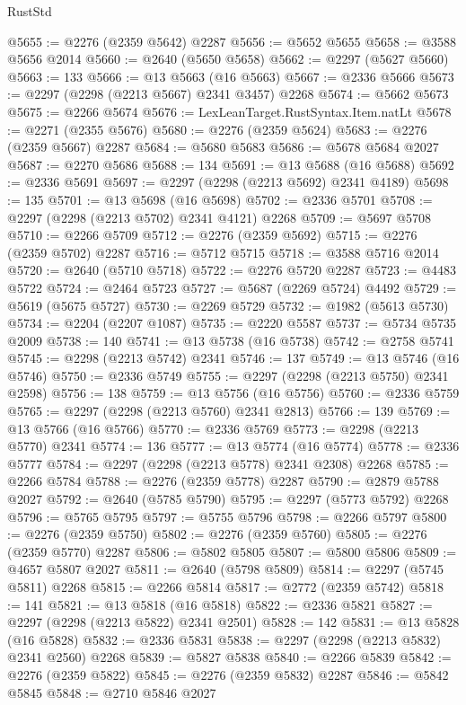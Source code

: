 \begin{lexlean}{RustStd}
\begin{coremodule}
{\begin{coremodule}
{{{{{{{{{{{{{{{{{{{{{{{{{{{{{{{{{{{{{{{{{{{{{{{{{{{{{{@5655 := @2276 (@2359 @5642) @2287
@5656 := @5652 @5655
@5658 := @3588 @5656 @2014
@5660 := @2640 (@5650 @5658)
@5662 := @2297 (@5627 @5660)
@5663 := 133
@5666 := @13 @5663 (@16 @5663)
@5667 := @2336 @5666
@5673 := @2297 (@2298 (@2213 @5667) @2341 @3457) @2268
@5674 := @5662 @5673
@5675 := @2266 @5674
@5676 := LexLeanTarget.RustSyntax.Item.natLt
@5678 := @2271 (@2355 @5676)
@5680 := @2276 (@2359 @5624)
@5683 := @2276 (@2359 @5667) @2287
@5684 := @5680 @5683
@5686 := @5678 @5684 @2027
@5687 := @2270 @5686
@5688 := 134
@5691 := @13 @5688 (@16 @5688)
@5692 := @2336 @5691
@5697 := @2297 (@2298 (@2213 @5692) @2341 @4189)
@5698 := 135
@5701 := @13 @5698 (@16 @5698)
@5702 := @2336 @5701
@5708 := @2297 (@2298 (@2213 @5702) @2341 @4121) @2268
@5709 := @5697 @5708
@5710 := @2266 @5709
@5712 := @2276 (@2359 @5692)
@5715 := @2276 (@2359 @5702) @2287
@5716 := @5712 @5715
@5718 := @3588 @5716 @2014
@5720 := @2640 (@5710 @5718)
@5722 := @2276 @5720 @2287
@5723 := @4483 @5722
@5724 := @2464 @5723
@5727 := @5687 (@2269 @5724) @4492
@5729 := @5619 (@5675 @5727)
@5730 := @2269 @5729
@5732 := @1982 (@5613 @5730)
@5734 := @2204 (@2207 @1087)
@5735 := @2220 @5587
@5737 := @5734 @5735 @2009
@5738 := 140
@5741 := @13 @5738 (@16 @5738)
@5742 := @2758 @5741
@5745 := @2298 (@2213 @5742) @2341
@5746 := 137
@5749 := @13 @5746 (@16 @5746)
@5750 := @2336 @5749
@5755 := @2297 (@2298 (@2213 @5750) @2341 @2598)
@5756 := 138
@5759 := @13 @5756 (@16 @5756)
@5760 := @2336 @5759
@5765 := @2297 (@2298 (@2213 @5760) @2341 @2813)
@5766 := 139
@5769 := @13 @5766 (@16 @5766)
@5770 := @2336 @5769
@5773 := @2298 (@2213 @5770) @2341
@5774 := 136
@5777 := @13 @5774 (@16 @5774)
@5778 := @2336 @5777
@5784 := @2297 (@2298 (@2213 @5778) @2341 @2308) @2268
@5785 := @2266 @5784
@5788 := @2276 (@2359 @5778) @2287
@5790 := @2879 @5788 @2027
@5792 := @2640 (@5785 @5790)
@5795 := @2297 (@5773 @5792) @2268
@5796 := @5765 @5795
@5797 := @5755 @5796
@5798 := @2266 @5797
@5800 := @2276 (@2359 @5750)
@5802 := @2276 (@2359 @5760)
@5805 := @2276 (@2359 @5770) @2287
@5806 := @5802 @5805
@5807 := @5800 @5806
@5809 := @4657 @5807 @2027
@5811 := @2640 (@5798 @5809)
@5814 := @2297 (@5745 @5811) @2268
@5815 := @2266 @5814
@5817 := @2772 (@2359 @5742)
@5818 := 141
@5821 := @13 @5818 (@16 @5818)
@5822 := @2336 @5821
@5827 := @2297 (@2298 (@2213 @5822) @2341 @2501)
@5828 := 142
@5831 := @13 @5828 (@16 @5828)
@5832 := @2336 @5831
@5838 := @2297 (@2298 (@2213 @5832) @2341 @2560) @2268
@5839 := @5827 @5838
@5840 := @2266 @5839
@5842 := @2276 (@2359 @5822)
@5845 := @2276 (@2359 @5832) @2287
@5846 := @5842 @5845
@5848 := @2710 @5846 @2027
}}}}}}}}}}}}}}}}}}}}}}}}}}}}}}}}}}}}}}}}}}}}}}}}}}}}}}
\end{coremodule}}
\end{coremodule}
\end{lexlean}
